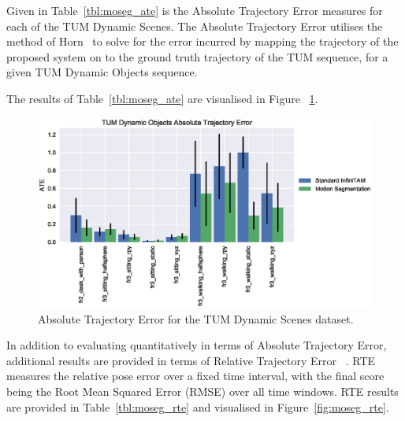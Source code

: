 Given in Table~\ref{tbl:moseg_ate} is the Absolute Trajectory Error measures
for each of the TUM Dynamic Scenes. The Absolute Trajectory Error utilises the
method of Horn~\cite{Horn1987} to solve for the error incurred by mapping the
trajectory of the proposed system on to the ground truth trajectory of the TUM
sequence, for a given TUM Dynamic Objects sequence.

The results of Table~\ref{tbl:moseg_ate} are visualised in Figure
~\ref{fig:moseg_ate}.

\begin{figure}[h]
  \label{fig:moseg_ate}
  \centering
  \includegraphics[width=\linewidth]{figures/moseg/ate.eps}
  \caption[Motion Segmentation ATE]
  {Absolute Trajectory Error for the TUM Dynamic Scenes dataset.}
\end{figure}

In addition to evaluating quantitatively in terms of Absolute Trajectory Error,
additional results are provided in terms of Relative Trajectory Error
~\cite{Sturm2012}. RTE measures the relative pose error over a fixed time
interval, with the final score being the Root Mean Squared Error (RMSE) over all 
time windows. RTE results are provided in Table~\ref{tbl:moseg_rte} and visualised 
in Figure~\ref{fig:moseg_rte}.


